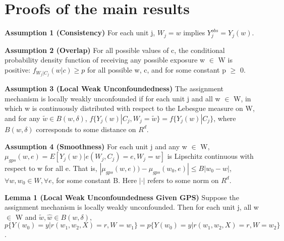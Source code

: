 \documentclass[11pt]{article}
\numberwithin{equation}{section}
\theoremstyle{definition}
\begin{document}
\section{Proofs of the main results}\label{sec:main-proof}
\noindent \textbf{Assumption 1 (Consistency)} For each unit j, $W_j = w$ implies $Y^{obs}_j = Y_j (w)$.

\noindent \textbf{Assumption 2 (Overlap)} For all possible values of c, the conditional probability density function of receiving any possible exposure w $\in$ W is positive: $f_{W_j |C_j} (w | c) \geq p$ for all possible w, c, and for some constant p $\ge$ 0.

\noindent\textbf{Assumption 3 (Local Weak Unconfoundedness)} The assignment mechanism is locally weakly unconfounded if for each unit j and all w $\in$ W, in which w is continuously distributed with respect to the Lebesgue measure on W, and for any $\tilde{w} \in B(w,\delta)$, $f\{Y_j (w) | C_j , W_j = \tilde{w}\} = f\{Y_j (w) | C_j \}$, where $B(w,\delta)$ corresponds to some distance on $R^d$.

\noindent \textbf{Assumption 4 (Smoothness)} For each unit j and any w $\in$ W, $\mu_{gps}(w, e) = E[Y_j (w) | e(W_j , C_j ) =e, W_j = w]$ is Lipschitz continuous with respect to w for all e. That is, $|\mu_{gps}(w, e))-\mu_{gps}(w_0
, e)|\leq
B|w_0-w|$, $\forall w, w_0 \in W, \forall e$, for some constant B. Here $|\cdot|$ refers to some norm on $R^d$. 



\noindent\textbf{Lemma 1 (Local Weak Unconfoundedness Given GPS)} Suppose the assignment mechanism
is locally weakly unconfounded. Then for each unit j, all w $\in$ W and $\tilde{w},\hat{w} \in B(w,\delta)$, $p\{Y(w_0)=y| r(w_1,w_2,X)=r, W=w_1\} = p\{Y(w_0)=y| r(w_1,w_2,X)=r, W=w_2\}$.
\end{document}
